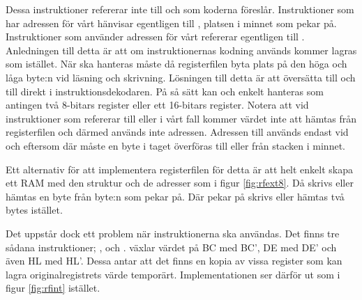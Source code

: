 \documentclass[main.tex]{subfiles}
\begin{document}
Dessa instruktioner refererar inte till  och  som koderna
föreslår. Instruktioner som har adressen för vårt  hänvisar egentligen
till , platsen i minnet som  pekar på. Instruktioner som
använder adressen för vårt  refererar egentligen till .
Anledningen till detta är att om instruktionernas kodning används kommer
 lagras som  istället. När  ska hanteras måste då
registerfilen byta plats på den höga och låga byte:n vid läsning och skrivning.
Lösningen till detta är att översätta  till  och 
till  direkt i instruktionsdekodaren. På så sätt kan  och
 enkelt hanteras som antingen två 8-bitars register eller ett 16-bitars
register. Notera att vid instruktioner som refererar till  eller i
vårt fall  kommer värdet inte att hämtas från registerfilen och därmed
används inte adressen. Adressen till  används endast vid 
och  eftersom där måste en byte i taget överföras till eller från
stacken i minnet.

Ett alternativ för att implementera registerfilen för detta är att helt enkelt
skapa ett RAM med den struktur och de adresser som i figur \ref{fig:rfext8}. Då
skrivs eller hämtas en byte från byte:n som  pekar på. Där
 pekar på skrivs eller hämtas två bytes istället.

Det uppstår dock ett problem när  instruktionerna ska användas. Det
finns tre sådana instruktioner; ,  och
.  växlar värdet på BC med BC', DE med DE' och även HL med
HL'. Dessa antar att det finns en kopia av vissa register som kan lagra
originalregistrets värde temporärt. Implementationen ser därför ut som i figur
\ref{fig:rfint} istället.
\end{document}
